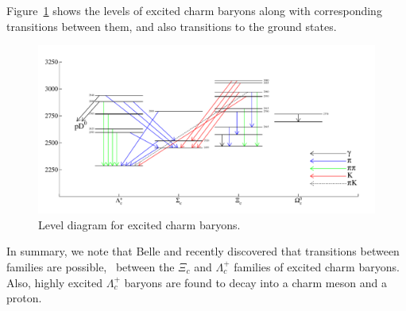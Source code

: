  

Figure~\ref{charm:leveldiagram} shows the levels of excited charm
baryons along with corresponding transitions between them, and
also transitions to the ground states.
\begin{figure}[!htb]
\includegraphics[width=1.0\textwidth]{./figures/charm/charm_baryons2014.pdf}
\caption{Level diagram for excited charm baryons.}
\label{charm:leveldiagram}
\end{figure} 
In summary, we note that Belle and \babar  recently discovered
that transitions between families are possible, \ie\ between the 
$\Xi_c$ and $\Lambda_c^+$ families of excited charm baryons. Also,
highly excited $\Lambda_c^+$ baryons are found to decay into 
a charm meson and a proton.    



